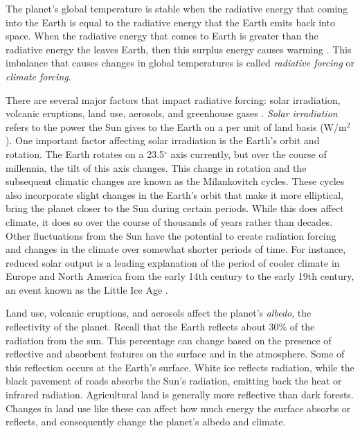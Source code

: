 The planet's global temperature is stable when the radiative energy that coming into the Earth is equal to the radiative energy that the Earth emits back into space. When the radiative energy that comes to Earth is greater than the radiative energy the leaves Earth, then this surplus energy causes warming \citep{noaa}. This imbalance that causes changes in global temperatures is called \emph{radiative forcing} or \emph{climate forcing}.

There are several major factors that impact radiative forcing: solar irradiation, volcanic eruptions, land use, aerosols, and greenhouse gases \citep{SINGH202179}. \emph{Solar irradiation} refers to the power the Sun gives to the Earth on a per unit of land basis (W/m$^2$). One important factor affecting solar irradiation is the Earth's orbit and rotation. The Earth rotates on a 23.5$^\circ$ axis currently, but over the course of millennia, the tilt of this axis changes. This change in rotation and the subsequent climatic changes are known as the Milankovitch cycles. These cycles also incorporate slight changes in the Earth's orbit that make it more elliptical, bring the planet closer to the Sun during certain periods. While this does affect climate, it does so over the course of thousands of years rather than decades. Other fluctuations from the Sun have the potential to create radiation forcing and changes in the climate over somewhat shorter periods of time. For instance, reduced solar output is a leading explanation of the period of cooler climate in Europe and North America from the early 14th century to the early 19th century, an event known as the Little Ice Age \citep{little_ice}.

Land use, volcanic eruptions, and aerosols affect the planet's \emph{albedo}, the reflectivity of the planet. Recall that the Earth reflects about 30\% of the radiation from the sun. This percentage can change based on the presence of reflective and absorbent features on the surface and in the atmosphere. Some of this reflection occurs at the Earth's surface. White ice reflects radiation, while the black pavement of roads absorbs the Sun's radiation, emitting back the heat or infrared radiation. Agricultural land is generally more reflective than dark forests. Changes in land use like these can affect how much energy the surface absorbs or reflects, and consequently change the planet's albedo and climate. 

